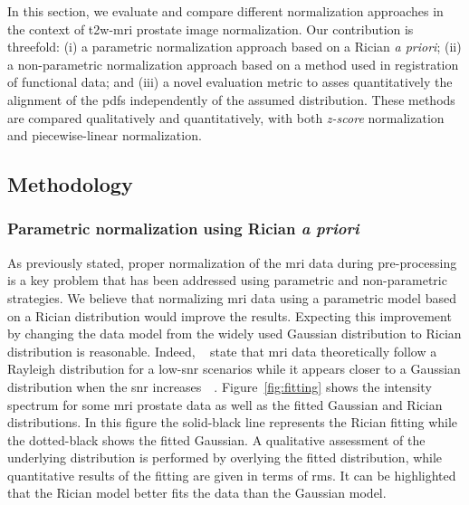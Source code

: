 In this section, we evaluate and compare different normalization approaches in the context of \ac{t2w}-\ac{mri} prostate image normalization.
Our contribution is threefold: (i) a parametric normalization approach based on a Rician \textit{a priori}; (ii) a non-parametric normalization approach based on a method used in registration of functional data; and (iii) a novel evaluation metric to asses quantitatively the alignment of the \acp{pdf} independently of the assumed distribution. 
These methods are compared qualitatively and quantitatively, with both \textit{z-score} normalization and piecewise-linear normalization.

\subsection{Methodology}\label{subsec:chp5:T2-norm:meth}

\subsubsection{Parametric normalization using Rician \textit{a priori}}\label{subsubsec:chp5:T2-norm:meth:rician}
As previously stated, proper normalization of the \ac{mri} data during pre-processing is a key problem that has been addressed using parametric and non-parametric strategies.
We believe that normalizing \ac{mri} data using a parametric model based on a Rician distribution would improve the results.
Expecting this improvement by changing the data model from the widely used Gaussian distribution to Rician distribution is reasonable.
Indeed, \citeauthor{Bernstein1989}~\cite{Bernstein1989} state that \ac{mri} data theoretically follow a Rayleigh distribution for a low-\ac{snr} scenarios while it appears closer to a Gaussian distribution when the \ac{snr} increases~\citeauthor{Bernstein1989}~\cite{Bernstein1989}.
Figure~\ref{fig:fitting} shows the intensity spectrum for some \ac{mri} prostate data as well as the fitted Gaussian and Rician distributions.
In this figure the solid-black line represents the Rician fitting while the dotted-black shows the fitted Gaussian.
A qualitative assessment of the underlying distribution is performed by overlying the fitted distribution, while quantitative results of the fitting are given in terms of \ac{rms}.
It can be highlighted that the Rician model better fits the data than the Gaussian model.

